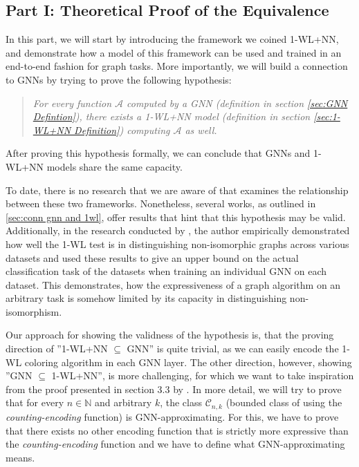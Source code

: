 \documentclass[11pt, dvipsnames, DIV=12]{scrreprt}
\theoremstyle{definition}
\newcommand{\Nb}{\mathbb{N}}
\newcommand{\wlnn}{\text{1-WL+NN }}
\begin{document}
\subsection{Part I: Theoretical Proof of the Equivalence}
In this part, we will start by introducing the framework we coined 1-WL+NN, and demonstrate how a model of this framework can be used and trained in an end-to-end fashion for graph tasks. More importantly, we will build a connection to GNNs by trying to prove the following hypothesis:

\begin{quote}
\textit{
    For every function $\mathcal{A}$ computed by a GNN (definition in section \ref{sec:GNN Defintion}), there exists a 1-WL+NN model (definition in section \ref{sec:1-WL+NN Definition}) computing $\mathcal{A}$ as well.
}
\end{quote}
After proving this hypothesis formally, we can conclude that GNNs and 1-WL+NN models share the same capacity.

To date, there is no research that we are aware of that examines the relationship between these two
frameworks. Nonetheless, several works, as outlined in \ref{sec:conn gnn and 1wl}, offer results that hint that this hypothesis may be valid.  Additionally, in the research conducted by \cite{Zopf2022}, the author empirically demonstrated how well the 1-WL test is in distinguishing non-isomorphic graphs across various datasets and used these results to give an upper bound on the actual classification task of the datasets when training an individual GNN on each dataset. This demonstrates, how the expressiveness of a graph algorithm on an arbitrary task is somehow limited by its capacity in distinguishing non-isomorphism.

Our approach for showing the validness of the hypothesis is, that the proving direction of ''1-WL+NN $\subseteq$ GNN'' is quite trivial, as we can easily encode the 1-WL coloring algorithm in each GNN layer. The other direction, however, showing ''GNN $\subseteq$ 1-WL+NN'', is more challenging, for which we want to take inspiration from the proof presented in section 3.3 by \cite{Xu2018}. In more detail, we will try to prove that for every $n \in \Nb$ and arbitrary $k$, the class $\mathcal{C}_{n,k}$ (bounded class of \wlnn using the \emph{counting-encoding} function) is GNN-approximating. For this, we have to prove that there exists no other encoding function that is strictly more expressive than the \emph{counting-encoding} function and we have to define what GNN-approximating means.
\end{document}
